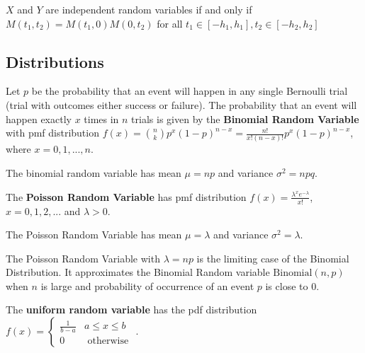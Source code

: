 \begin{thm}
    $X$ and $Y$ are independent random variables if and only if $M(t_1, t_2) = M(t_1, 0) M(0, t_2)$ for all $t_1 \in [-h_1, h_1], t_2 \in [-h_2, h_2]$
\end{thm}


\subsection{Distributions}

\begin{defn}
    Let $p$ be the probability that an event will happen in any single Bernoulli trial (trial with outcomes either success or failure). The probability that an event will happen exactly $x$ times in $n$ trials is given by the \textbf{Binomial Random Variable} with pmf distribution $f(x) = {n \choose k} p^x (1-p)^{n-x} = \displaystyle \frac{n!}{x! (n-x)!} p^x (1-p)^{n-x}$, where $x = 0, 1, ... , n$.
\end{defn}

\begin{prop}
The binomial random variable has mean $\mu = np$ and variance $\sigma^2 = npq$.
\end{prop}

\begin{defn}
    The \textbf{Poisson Random Variable} has pmf distribution $f(x) = \displaystyle \frac{\lambda^x e^{-\lambda}}{x!}$, $x = 0, 1, 2, ...$ and $\lambda > 0$.
\end{defn}

\begin{prop}
The Poisson Random Variable has mean $\mu = \lambda$ and variance $\sigma^2 = \lambda$.
\end{prop}
\begin{prop}
    The Poisson Random Variable with $\lambda = np$ is the limiting case of the Binomial Distribution. It approximates the Binomial Random variable $\text{Binomial}(n,p)$ when $n$ is large and probability of occurrence of an event $p$ is close to $0$.
\end{prop}

\begin{defn}    
    The \textbf{uniform random variable} has the pdf distribution $f(x) = \begin{cases} \frac{1}{b-a} & a \leq x \leq b \\ 0 & \text { otherwise }\end{cases}$.
\end{defn}

